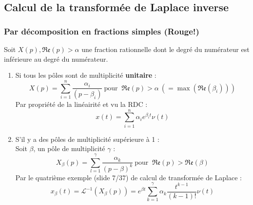 \subsection{Calcul de la transformée de Laplace inverse}
		
\subsubsection{Par décomposition en fractions simples (Rouge!)}
Soit $X(p), \mathfrak{Re}(p) > \alpha$ une fraction rationnelle dont le degré du 
numérateur est inférieure au degré du numérateur.
\begin{enumerate}
	\item Si tous les pôles sont de multiplicité \textbf{unitaire} : 
	      \begin{equation}
	      	X(p) = \sum_{i=1}^n \dfrac{\alpha_i}{(p-\beta_i)}\ \text{pour }\ \mathfrak{Re}(p) >
	      	\alpha\ (=\max(\mathfrak{Re}(\beta_i)))
	      \end{equation}
	      Par propriété de la linéairité et vu la RDC :
	      \begin{equation}
	      	x(t) = \sum_{i=1}^n \alpha_i e^{\beta_it}\nu(t)
	      	\label{eq:Sl8}
	      \end{equation}
	\item S'il y a des pôles de multiplicité supérieure à 1 :\\
	      Soit $\beta$, un pôle de multiplicité $\gamma$ :
	      \begin{equation}
	      	X_\beta(p) = \sum_{l=1}^\gamma \dfrac{\alpha_k}{(p-\beta)^k}\ \text{pour }\ \mathfrak{Re}(p) >
	      	\mathfrak{Re}(\beta)
	      \end{equation}
	      Par le quatrième exemple (slide 7/37) de calcul de transformée de Laplace :
	      \begin{equation}
	      	x_\beta(t) = \mathcal{L}^{-1}(X_\beta(p)) = e^{\beta t}\sum_{k=1}^\gamma \alpha_k
	      	\dfrac{t^{k-1}}{(k-1)!}\nu(t)
	      \end{equation}
\end{enumerate}


